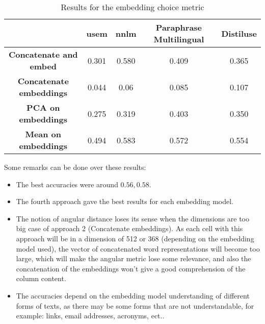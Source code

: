 \begin{table}[h]
    \begin{center}
        \begin{tabular}{|c | c | c | c| c|}
            \hline
                                            & \textbf{\acrshort{usem}}         &
            \textbf{\acrshort{nnlm}}        & \textbf{Paraphrase Multilingual} &
            \textbf{Distiluse}
            \\
            \hline

            \textbf{Concatenate and embed}  & 0.301                            & 0.580
                                            & 0.409                            & 0.365
            \\
            \hline

            \textbf{Concatenate embeddings} & 0.044                            & 0.06  &
            0.085                           & 0.107                                      \\
            \hline

            \textbf{PCA on embeddings}      & 0.275                            & 0.319
                                            & 0.403                            & 0.350
            \\
            \hline

            \textbf{Mean on embeddings}     & 0.494                            & 0.583
                                            & 0.572                            & 0.554
            \\
            \hline
        \end{tabular}
    \end{center}
    \caption{Results for the embedding choice metric}
    \label{table:embedding_metric_result}
\end{table}
Some remarks can be done over these results:
\begin{itemize}
    \item The best accuracies were around $0.56, 0.58$.
    \item The fourth approach gave the best results for each embedding model.
    \item The notion of angular distance loses its sense when the dimensions are
          too big case of approach 2 (Concatenate embeddings). As each cell with
          this approach will be in a dimension of 512 or 368 (depending on the
          embedding model used), the vector of concatenated word representations
          will become too large, which will make the angular metric lose some
          relevance, and also the concatenation of the embeddings won't give a
          good comprehension of the column content.
    \item The accuracies depend on the embedding model understanding of
          different forms of texts, as there may be some forms that are not
          understandable, for example: links, email addresses, acronyms, ect..

\end{itemize}

